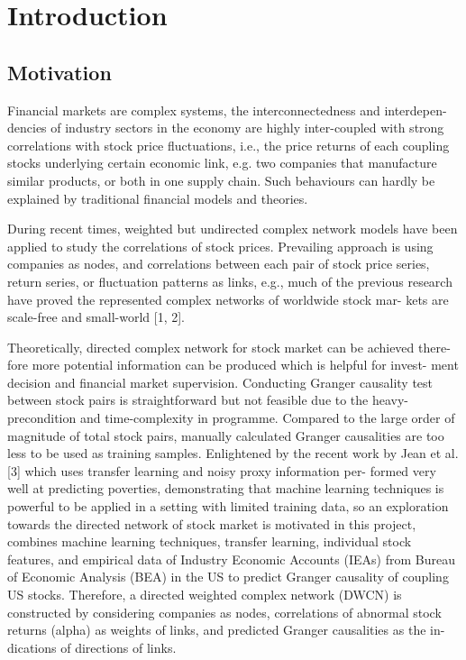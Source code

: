 \chapter{Introduction}
\section{Motivation}
Financial markets are complex systems, the interconnectedness and interdepen- dencies of industry sectors in the economy are highly inter-coupled with strong correlations with stock price fluctuations, i.e., the price returns of each coupling stocks underlying certain economic link, e.g. two companies that manufacture similar products, or both in one supply chain. Such behaviours can hardly be explained by traditional financial models and theories.

During recent times, weighted but undirected complex network models have been applied to study the correlations of stock prices. Prevailing approach is using companies as nodes, and correlations between each pair of stock price series, return series, or fluctuation patterns as links, e.g., much of the previous research have proved the represented complex networks of worldwide stock mar- kets are scale-free and small-world [1, 2].

Theoretically, directed complex network for stock market can be achieved there- fore more potential information can be produced which is helpful for invest- ment decision and financial market supervision. Conducting Granger causality test between stock pairs is straightforward but not feasible due to the heavy- precondition and time-complexity in programme. Compared to the large order of magnitude of total stock pairs, manually calculated Granger causalities are too less to be used as training samples. Enlightened by the recent work by Jean et al. [3] which uses transfer learning and noisy proxy information per- formed very well at predicting poverties, demonstrating that machine learning techniques is powerful to be applied in a setting with limited training data, so an exploration towards the directed network of stock market is motivated in this project, combines machine learning techniques, transfer learning, individual stock features, and empirical data of Industry Economic Accounts (IEAs) from Bureau of Economic Analysis (BEA) in the US to predict Granger causality of coupling US stocks. Therefore, a directed weighted complex network (DWCN) is constructed by considering companies as nodes, correlations of abnormal stock returns (alpha) as weights of links, and predicted Granger causalities as the in- dications of directions of links.

